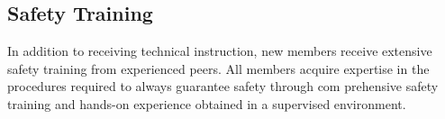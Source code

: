 \subsection{Safety Training}

In addition to receiving technical instruction, new members receive extensive safety training from experienced peers. All members acquire expertise in the procedures required to always guarantee safety through com prehensive safety training and hands-on experience obtained in a supervised environment.
